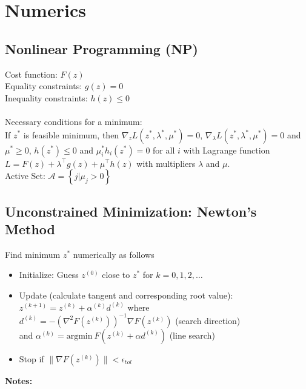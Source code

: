\documentclass[english]{latex4ei/latex4ei_sheet}
\begin{document}
\section{Numerics}
\begin{sectionbox}

\subsection{Nonlinear Programming (NP)}
Cost function: $F(z)$\\
Equality constraints: $g(z)=0$\\
Inequality constraints: $h(z)\leq 0$\\
\\
Necessary conditions for a minimum:\\
If $z^{*}$ is feasible minimum, then $\nabla_{z} L\left(z^{*}, \lambda^{*}, \mu^{*}\right)=0$, $\nabla_{\lambda} L\left(z^{*}, \lambda^{*}, \mu^{*}\right)=0$ and $\mu^{*} \geq 0$, $h\left(z^{*}\right) \leq 0$ and $\mu_{i}^{*} h_{i}\left(z^{*}\right)=0$ for all $i$ with Lagrange function $L=F(z)+\lambda^{\top} g(z)+\mu^{\top} h(z)$ with multipliers $\lambda$ and $\mu$.\\
Active Set: $\mathcal{A}=\left\{j | \mu_{j}>0\right\}$\\

\subsection{Unconstrained Minimization: Newton's Method}
Find minimum $z^{*}$ numerically as follows
\begin{itemize}
    \item Initialize: Guess $z^{(0)}$ close to $z^{*}$ for $k=0,1,2,\ldots$
    \item Update (calculate tangent and corresponding root value):\\
    $z^{(k+1)}=z^{(k)}+\alpha^{(k)} d^{(k)}$ where\\ $d^{(k)}=-\left(\nabla^{2} F\left(z^{(k)}\right)\right)^{-1} \nabla F\left(z^{(k)}\right)$ (search direction)\\
    and $\alpha^{(k)}=\textrm{argmin}\ F(z^{(k)}+\alpha d^{(k)})$ (line search)
    \item Stop if $\|\nabla F(z^{(k)})\|<\epsilon_{tol}$
\end{itemize}\vspace{0.2cm}

\end{sectionbox}
\textbf{Notes:}
\end{document}
